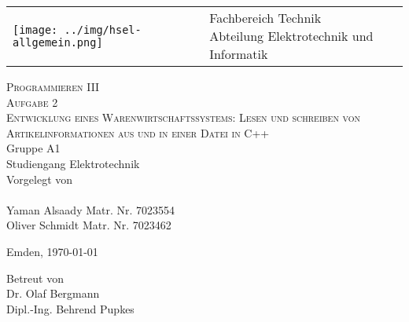 \begin{titlepage}

\vspace{-0.5cm}
\hspace{-0.5cm}
\begin{tabular}{p{8.0cm} p{8.0cm}}
  \texttt{[image: ../img/hsel-allgemein.png]} &
   \parbox[b]{8.0cm}{
     {\large 	Fachbereich Technik }\\
     {\large 	Abteilung Elektrotechnik und Informatik }     
    } \\
   \\
   \hline
\end{tabular}
%
\begin{center}

\vspace{2.5cm}
\LARGE{\textsc{
    Programmieren III\\ Aufgabe 2
}}\\

\vspace{2.5cm}
\LARGE{\textsc{
{Entwicklung eines Warenwirtschaftssystems: Lesen und schreiben von Artikelinformationen aus und in einer Datei in C++}
}}\\

\vspace{2cm}%
\large
Gruppe A1\\
Studiengang Elektrotechnik\\
Vorgelegt von\\\ \\
Yaman Alsaady\hspace{2cm} Matr. Nr. 7023554\\
Oliver Schmidt\hspace{2cm} Matr. Nr. 7023462


\vspace{1cm} 
Emden, \today

\vspace{3.5cm}%
Betreut von\\ Dr. Olaf Bergmann\\Dipl.-Ing. Behrend Pupkes

\end{center}
\normalsize
\end{titlepage}
